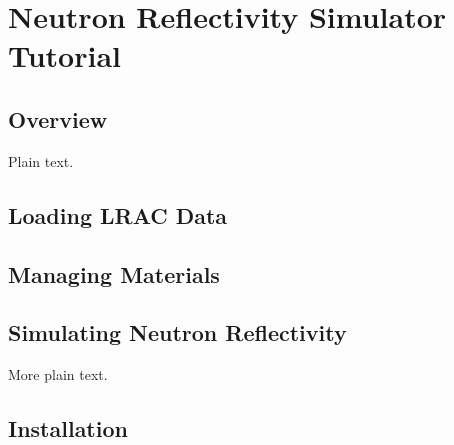 \documentclass{article}
\begin{document}
\section{Neutron Reflectivity Simulator Tutorial}

\subsection{Overview}

Plain text.

\subsection{Loading LRAC Data}
\subsection{Managing Materials}
\subsection{Simulating Neutron Reflectivity}

More plain text.

\subsection{Installation}
\end{document}
